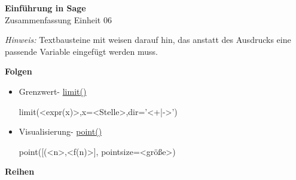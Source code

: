 \documentclass[a4paper,9pt,DIV15,twocolumn]{scrartcl}
\begin{document}
\begin{center}
    \textbf{\LARGE Einführung in Sage}\\
    {\large Zusammenfassung Einheit 06}
\end{center}
\textsl{Hinweis:} Textbausteine mit  weisen darauf hin, das anstatt des Ausdrucks eine passende Variable eingefügt werden muss.

\medskip

\textbf{Folgen}

\begin{itemize}
 \item Grenzwert- \href{https://sage.math.uni-goettingen.de/doc/static/reference/sage/calculus/functional.html?highlight=function#sage.calculus.functional.limit}{limit()}
\begin{sagein}
limit(<expr(x)>,x=<Stelle>,dir='<+|->')
\end{sagein}
\item Visualisierung- \href{https://sage.math.uni-goettingen.de/doc/static/reference/sage/plot/point.html?highlight=plot.point#points}{point()}
\begin{sagein}
point([(<n>,<f(n)>], pointsize=<größe>)
\end{sagein}
\end{itemize}


\textbf{Reihen}
\end{document}
